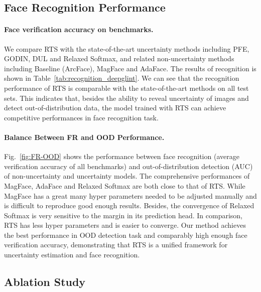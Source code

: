 \documentclass[letterpaper]{article} %
\begin{document}
\subsection{Face Recognition Performance}
\label{ssec:face recognition}
\paragraph{Face verification accuracy on benchmarks.} We compare RTS with the state-of-the-art uncertainty methods including PFE, GODIN, DUL and Relaxed Softmax, and related non-uncertainty methods including Baseline (ArcFace), MagFace and AdaFace.
The results of recognition is shown in Table~\ref{tab:recognition_deepglint}. We can see that the recognition performance of RTS is comparable with the state-of-the-art methods on all test sets. This indicates that, besides the ability to reveal uncertainty of images and detect out-of-distribution data, the model trained with RTS can achieve competitive performances in face recognition task.

\paragraph{Balance Between FR and OOD Performance. } Fig.~\ref{fig:FR-OOD} shows the performance between face recognition (average verification accuracy of all benchmarks) and out-of-distribution detection (AUC) of non-uncertainty and uncertainty models. The comprehensive performances of MagFace, AdaFace and Relaxed Softmax are both close to that of RTS. While MagFace has a great many hyper parameters needed to be adjusted manually and is difficult to reproduce good enough results. Besides, the convergence of Relaxed Softmax is very sensitive to the margin in its prediction head. In comparison, RTS has less hyper parameters and is easier to converge. Our method achieves the best performance in OOD detection task and comparably high enough face verification accuracy, demonstrating that RTS is a unified framework for uncertainty estimation and face recognition.










\subsection{Ablation Study}
\label{ssec:ablation}
\end{document}
